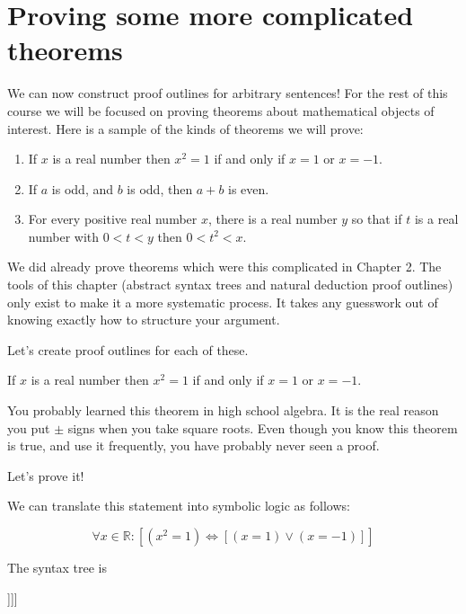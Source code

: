 \section{Proving some more complicated theorems}

We can now construct proof outlines for arbitrary sentences!  For the rest of this course we will be focused on proving theorems about mathematical objects of interest.  Here is a sample of the kinds of theorems we will prove:

\begin{enumerate}
		\item If $x$ is a real number then $x^2 = 1$ if and only if $x=1$ or $x=-1$.
		\item If $a$ is odd, and $b$ is odd, then $a+b$ is even.
		\item For every positive real number $x$, there is a real number $y$ so that if $t$ is a real number with $0<t<y$ then $0<t^2<x$.
\end{enumerate}

We did already prove theorems which were this complicated in Chapter 2.  The tools of this chapter (abstract syntax trees and natural deduction proof outlines) only exist to make it a more systematic process.  It takes any guesswork out of knowing exactly how to structure your argument.

Let's create proof outlines for each of these. 
\medskip

\begin{theorem}
		If $x$ is a real number then $x^2 = 1$ if and only if $x=1$ or $x=-1$.
	\end{theorem}
	
	You probably learned this theorem in high school algebra.  It is the real reason you put $\pm$ signs when you take square roots.  Even though you know this theorem is true, and use it frequently, you have probably never seen a proof.  
	
	Let's prove it!

We can translate this statement into symbolic logic as follows:

\[
\forall x \in \mathbb{R} : [ ({x^2 = 1}) \iff [({x=1}) \vee ({x=-1})] ]
\]

The syntax tree is

\begin{center}
		\begin{forest}
				[\(\forall x \in \mathbb{R}\)[\(\iff\)[\({x^2 = 1}\)][\(\vee\)[\({x=1}\)][\({x=-1}\)]]]]
			\end{forest}
	\end{center}


